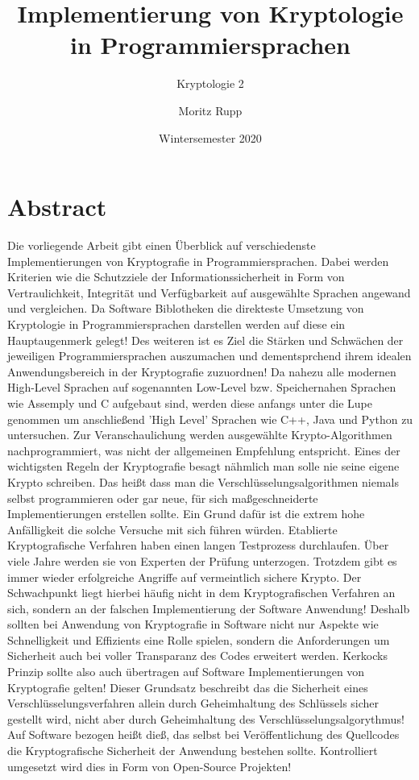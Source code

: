 \documentclass[a4paper,12pt]{scrartcl}
\title{Implementierung von Kryptologie in Programmiersprachen}
\subtitle{Kryptologie 2}
\author{Moritz Rupp}
\date{Wintersemester 2020}
\begin{document}
\maketitle
\newpage
\tableofcontents
\newpage


\section{Abstract}

Die vorliegende Arbeit gibt einen Überblick auf verschiedenste Implementierungen von Kryptografie in Programmiersprachen. Dabei werden Kriterien wie die Schutzziele der Informationssicherheit in Form von Vertraulichkeit, Integrität und Verfügbarkeit auf ausgewählte Sprachen angewand und vergleichen. Da Software Biblotheken die direkteste Umsetzung von Kryptologie in Programmiersprachen darstellen werden auf diese ein Hauptaugenmerk gelegt! Des weiteren ist es Ziel die Stärken und Schwächen der jeweiligen Programmiersprachen auszumachen und dementsprchend ihrem idealen Anwendungsbereich in der Kryptografie zuzuordnen! Da nahezu alle modernen High-Level Sprachen auf sogenannten Low-Level bzw. Speichernahen Sprachen wie Assemply und C aufgebaut sind, werden diese anfangs unter die Lupe genommen um anschließend 'High Level' Sprachen wie C++, Java und Python zu untersuchen. Zur Veranschaulichung werden ausgewählte Krypto-Algorithmen nachprogrammiert, was nicht der allgemeinen Empfehlung entspricht.
Eines der wichtigsten Regeln der Kryptografie besagt nähmlich man solle nie seine eigene Krypto schreiben.
Das heißt dass man die Verschlüsselungsalgorithmen niemals selbst programmieren oder gar neue, für sich maßgeschneiderte Implementierungen erstellen sollte. Ein Grund dafür ist die extrem hohe Anfälligkeit die solche Versuche mit sich führen würden.
Etablierte Kryptografische Verfahren haben einen langen Testprozess durchlaufen. Über viele Jahre werden sie von Experten der Prüfung unterzogen. Trotzdem gibt es immer wieder erfolgreiche Angriffe auf vermeintlich sichere Krypto. Der Schwachpunkt liegt hierbei häufig nicht in dem Kryptografischen Verfahren an sich, sondern an der falschen Implementierung der Software Anwendung! Deshalb sollten bei Anwendung von Kryptografie in Software nicht nur Aspekte wie Schnelligkeit und Effizients eine Rolle spielen, sondern die Anforderungen um Sicherheit auch bei voller Transparanz des Codes erweitert werden. Kerkocks Prinzip sollte also auch übertragen auf Software Implementierungen von Kryptografie gelten! Dieser Grundsatz beschreibt das die Sicherheit eines Verschlüsselungsverfahren allein durch Geheimhaltung des Schlüssels sicher gestellt wird, nicht aber durch Geheimhaltung des Verschlüsselungsalgorythmus! Auf Software bezogen heißt dieß, das selbst bei Veröffentlichung des Quellcodes die Kryptografische Sicherheit der Anwendung bestehen sollte. Kontrolliert umgesetzt wird dies in Form von Open-Source Projekten! 
\end{document}
